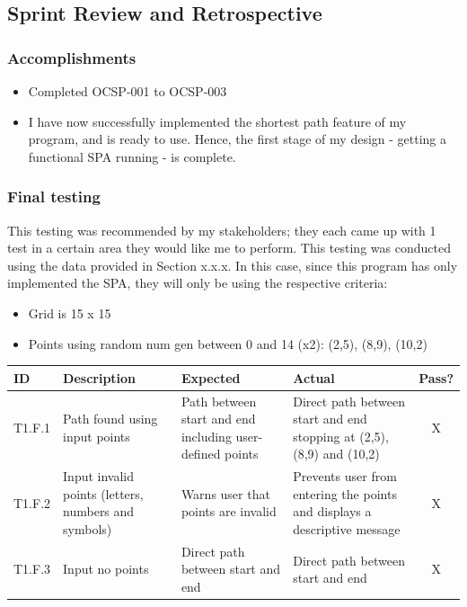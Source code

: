 \clearpage
\subsection{Sprint Review and Retrospective}

\subsubsection{Accomplishments}
\begin{itemize}
    \item Completed OCSP-001 to OCSP-003
    \item  I have now successfully implemented the shortest path feature of my program, and is ready to use. Hence, the first stage of my design - getting a functional SPA running - is complete.
\end{itemize}

\subsubsection{Final testing}

This testing was recommended by my stakeholders; they each came up with 1 test in a certain area they would like me to perform. This testing was conducted using the data provided in Section x.x.x. In this case, since this program has only implemented the SPA, they will only be using the respective criteria:

\begin{itemize}
\item Grid is 15 x 15
\item Points using random num gen between 0 and 14 (x2): (2,5), (8,9), (10,2) 

\end{itemize}

\begin{table}[htbp]
\centering
\begin{tabularx}{\textwidth}{|l|X|p{3.5cm}|p{3.5cm}|c|}
\hline
\textbf{ID} & \textbf{Description} & \textbf{Expected} & \textbf{Actual} & \textbf{Pass?} \\
\hline
T1.F.1 & Path found using input points & Path between start and end including user-defined points& Direct path between start and end stopping at (2,5), (8,9) and (10,2)  & X \\
\hline
T1.F.2 & Input invalid points (letters, numbers and symbols) & Warns user that points are invalid & Prevents user from entering the points and displays a descriptive message & X \\
\hline
T1.F.3 & Input no points &  Direct path between start and end & Direct path between start and end & X \\
\hline
\end{tabularx}
\end{table}


